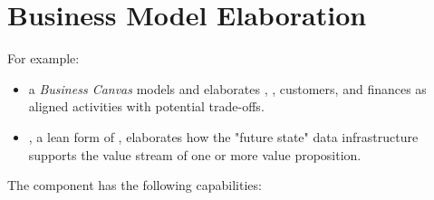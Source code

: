 \chapter{Business Model Elaboration}%
\label{ch:ekg-mm-a-2}
\label{ch:ekg-mm-business-model-elaboration}



For example:

\begin{itemize}
  \item a \textit{Business Canvas} models and elaborates ,
        , customers, and finances as aligned activities with potential trade-offs.
  \item {}, a lean form of , elaborates how the "future state" data infrastructure
  supports the value stream of one or more value proposition.
\end{itemize}

The  component has the following capabilities:

\begin{itemize}[leftmargin=.5in]
\end{itemize}






